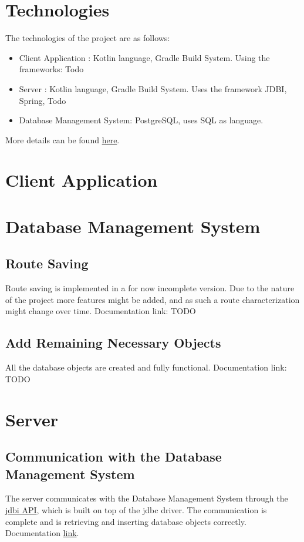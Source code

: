 \documentclass{article}
\begin{document}
    \newpage

    \section{Technologies}
        The technologies of the project are as follows:
        \begin{itemize}
            \item Client Application : Kotlin language, Gradle Build System. Using the frameworks: Todo
            \item Server : Kotlin language, Gradle Build System. Uses the framework JDBI, Spring, Todo
            \item Database Management System: PostgreSQL, uses SQL as language.
        \end{itemize}
        More details can be found \href{https://github.com/baltasarb/social-routing/wiki/1.-Choice-Of-Technologies}{here}.

    \newpage

    \section{Client Application}
   
    \newpage

    \section{Database Management System}
        \subsection*{Route Saving}
        Route saving is implemented in a for now incomplete version. Due to the nature of the project more features might be added, and as such a route characterization might change over time.
        Documentation link: TODO

        \subsection*{Add Remaining Necessary Objects}
        All the database objects are created and fully functional. 
        Documentation link: TODO

    \newpage

    \section{Server}    
        \subsection*{Communication with the Database Management System}
        The server communicates with the Database Management System through the \href{http://jdbi.org/}{jdbi API}, which is built on top of the jdbc driver.
        The communication is complete and is retrieving and inserting database objects correctly.
        Documentation \href{https://github.com/baltasarb/social-routing/wiki/3.-Communication-with-the-DBMS#jdbi}{link}.
\end{document}
